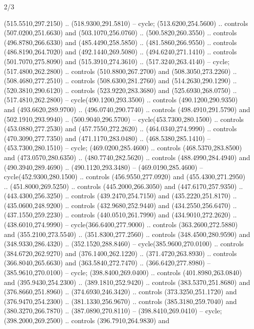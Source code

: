 \begin{flagdescription}{2/3}
\begin{scope}[xshift=0.5\flaglength,yshift=0.5\flagwidth,scale=\flagwidth/255]
\begin{scope}[y=-0.43pt, x=0.43pt,xshift=-193pt,yshift=133pt]
\begin{scope}[draw=black,line width=0.003\flagwidth]
\begin{scope}[fill=white]
  (515.5510,297.2150) .. (518.9300,291.5810) -- cycle;
 (513.6200,254.5600) .. controls (507.0200,251.6630) and
  (503.1070,256.0760) .. (500.5820,260.3550) .. controls (496.8780,266.6330) and
  (485.4490,258.5850) .. (481.5860,266.9550) .. controls (486.8190,264.7020) and
  (492.1440,269.5080) .. (494.6240,271.1410) .. controls (501.7070,275.8090) and
  (515.3910,274.3610) .. (517.3240,263.4140) -- cycle;
 (517.4800,262.2800) .. controls (510.8800,267.2700) and
  (508.3050,273.2260) .. (508.4680,277.2510) .. controls (508.6300,281.2760) and
  (514.2630,290.1290) .. (520.3810,290.6120) .. controls (523.9220,283.3680) and
  (525.6930,268.0750) .. (517.4810,262.2800) -- cycle(490.1200,293.3500) ..
  controls (490.1200,290.9350) and (493.6620,289.9700) .. (496.0740,290.7740) ..
  controls (498.4910,291.5790) and (502.1910,293.9940) .. (500.9040,296.5700) --
  cycle(453.7300,280.1500) .. controls (453.0880,277.2530) and
  (457.7550,272.2620) .. (464.0340,274.9990) .. controls (470.3090,277.7350) and
  (471.1170,283.0480) .. (468.5380,285.1410) -- (453.7300,280.1510) -- cycle;
 (469.0200,285.4600) .. controls (468.5370,283.8500) and
  (473.0570,280.6350) .. (480.7740,282.5620) .. controls (488.4990,284.4940) and
  (490.3940,289.4690) .. (490.1120,293.3480) -- (469.0190,285.4600) --
  cycle(452.9300,280.1500) .. controls (456.9550,277.0920) and
  (455.4300,271.2950) .. (451.8000,269.5250) .. controls (445.2000,266.3050) and
  (447.6170,257.9350) .. (443.4300,256.3250) .. controls (439.2470,254.7150) and
  (435.2220,251.8170) .. (435.0600,248.9200) .. controls (432.9680,252.9440) and
  (434.2550,256.6470) .. (437.1550,259.2230) .. controls (440.0510,261.7990) and
  (434.9010,272.2620) .. (438.6010,274.9990) -- cycle(366.6400,277.9000) ..
  controls (363.2600,272.5880) and (355.2100,273.5540) .. (351.8300,277.2560) ..
  controls (348.4500,280.9590) and (348.9330,286.4320) .. (352.1520,288.8460) --
  cycle(385.9600,270.0100) .. controls (384.6720,262.9270) and
  (376.1400,262.1220) .. (371.4720,263.8930) .. controls (366.8040,265.6630) and
  (363.5840,272.7470) .. (366.6420,277.8980) -- (385.9610,270.0100) -- cycle;
 (398.8400,269.0400) .. controls (401.8980,263.0840) and
  (395.9430,254.2300) .. (389.1810,252.9420) .. controls (383.5370,251.8680) and
  (376.8660,251.8960) .. (374.6930,246.3420) .. controls (373.3250,251.1720) and
  (376.9470,254.2300) .. (381.1330,256.9670) .. controls (385.3180,259.7040) and
  (380.3270,266.7870) .. (387.0890,270.8110) -- (398.8410,269.0410) -- cycle;
 (398.2000,269.2500) .. controls (396.7910,264.9830) and

\end{scope}
\end{scope}
\end{scope}
\end{scope}
\end{flagdescription}
